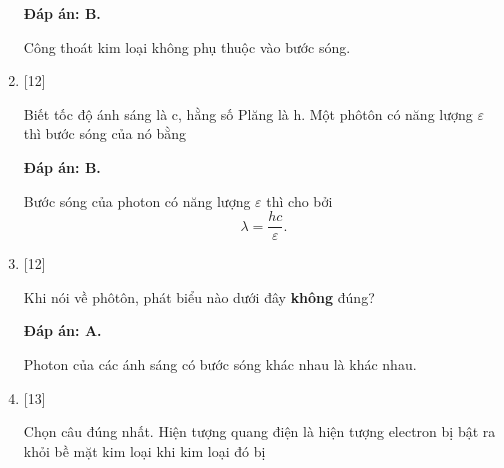 \begin{enumerate}[label=\bfseries Câu \arabic*:]
	\loigiai
	{		\textbf{Đáp án: B.}
		
		Công thoát kim loại không phụ thuộc vào bước sóng.
	}
	
	\item {} [12]
	\cauhoi
	{Biết tốc độ ánh sáng là c, hằng số Plăng là h. Một phôtôn có năng lượng $\varepsilon$ thì bước sóng của nó bằng
	}
	
	\loigiai
	{		\textbf{Đáp án: B.}
		
		Bước sóng của photon có năng lượng $\varepsilon$ thì cho bởi
		$$
		\lambda = \dfrac{hc}{\varepsilon}.
		$$
	}
	
	\item {} [12]
	\cauhoi
	{Khi nói về phôtôn, phát biểu nào dưới đây \textbf{không} đúng?
	}
	
	\loigiai
	{		\textbf{Đáp án: A.}
		
		Photon của các ánh sáng có bước sóng khác nhau là khác nhau.
	}
	
	\item {} [13]
	\cauhoi
	{Chọn câu đúng nhất. Hiện tượng quang điện là hiện tượng electron bị bật ra khỏi bề mặt kim loại khi kim loại đó bị
	}
	

\end{enumerate}
